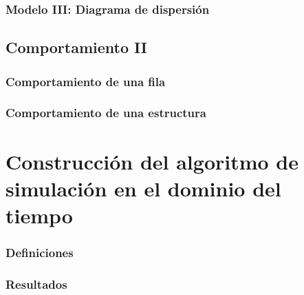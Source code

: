 \documentclass{beamer}
\begin{document}
		\begin{frame} %
		\frametitle{Modelo III: Diagrama de dispersión}
		\end{frame}
	
	\subsection{Comportamiento II}
		\begin{frame} %
		\frametitle{Comportamiento de una fila}
		\end{frame}
	
		\begin{frame} %
		\frametitle{Comportamiento de una estructura}
		\end{frame}
	
\section{Construcción del algoritmo de simulación en el dominio del tiempo}
		\begin{frame} %
		\frametitle{Definiciones}
		\end{frame}
	
		\begin{frame} %
		\frametitle{Resultados}
		\end{frame}
\end{document}
